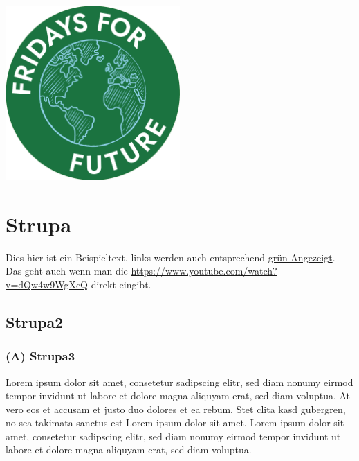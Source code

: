 \documentclass[a4paper,
  ]{scrartcl}
\begin{document}
\begin{center}
    \includegraphics[width=0.5\textwidth]{Logo.png}
\end{center}




\tableofcontents

\section{Strupa}
Dies hier ist ein Beispieltext, links werden auch entsprechend \href{https://www.youtube.com/watch?v=dQw4w9WgXcQ}{grün Angezeigt}. Das geht auch wenn man die \url{https://www.youtube.com/watch?v=dQw4w9WgXcQ} direkt eingibt.
\subsection{Strupa2}
\subsubsection*{ (A) Strupa3}
Lorem ipsum dolor sit amet, consetetur sadipscing elitr, sed diam nonumy eirmod tempor invidunt ut labore et dolore magna aliquyam erat, sed diam voluptua. At vero eos et accusam et justo duo dolores et ea rebum. Stet clita kasd gubergren, no sea takimata sanctus est Lorem ipsum dolor sit amet. Lorem ipsum dolor sit amet, consetetur sadipscing elitr, sed diam nonumy eirmod tempor invidunt ut labore et dolore magna aliquyam erat, sed diam voluptua.
\end{document}
